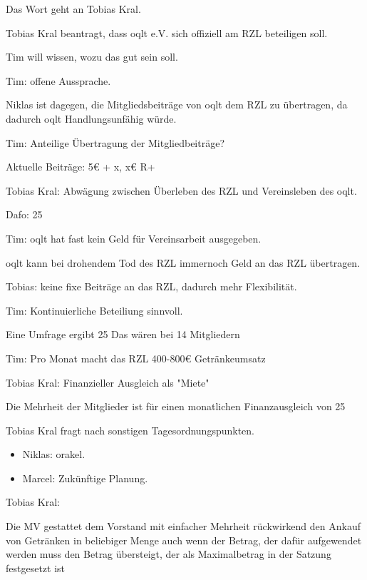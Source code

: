 \documentclass[parskip]{scrartcl}
\begin{document}
{Das Wort geht an Tobias Kral.

Tobias Kral beantragt, dass oqlt e.V. sich offiziell am RZL beteiligen soll.

Tim will wissen, wozu das gut sein soll.

Tim: offene Aussprache.

Niklas ist dagegen, die Mitgliedsbeiträge von oqlt dem RZL zu übertragen,
da dadurch oqlt Handlungsunfähig würde.

Tim: Anteilige Übertragung der Mitgliedbeiträge?

Aktuelle Beiträge: 5€ + x, x€ R+

Tobias Kral: Abwägung zwischen Überleben des RZL und Vereinsleben des oqlt.

Dafo: 25%

Tim: oqlt hat fast kein Geld für Vereinsarbeit ausgegeben.

oqlt kann bei drohendem Tod des RZL immernoch Geld an das RZL übertragen.

Tobias: keine fixe Beiträge an das RZL, dadurch mehr Flexibilität.

Tim: Kontinuierliche Beteiliung sinnvoll.

Eine Umfrage ergibt 25%
Das wären bei 14 Mitgliedern 

Tim: Pro Monat macht das RZL 400-800€ Getränkeumsatz

Tobias Kral: Finanzieller Ausgleich als "Miete"

Die Mehrheit der Mitglieder ist für einen monatlichen Finanzausgleich von 25%

Tobias Kral fragt nach sonstigen Tagesordnungspunkten.

\begin{itemize}
\item{} Niklas: orakel.
\item{} Marcel: Zukünftige Planung.
\end{itemize}

Tobias Kral:

Die MV gestattet dem Vorstand mit einfacher Mehrheit rückwirkend den Ankauf von Getränken in beliebiger Menge
auch wenn der Betrag, der dafür aufgewendet werden muss den Betrag übersteigt, der als Maximalbetrag in der 
Satzung festgesetzt ist

}
\end{document}
